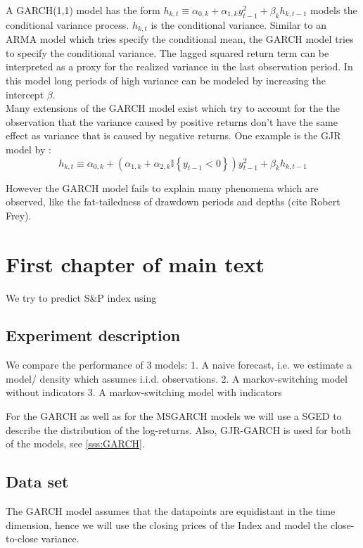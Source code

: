 \documentclass[11pt,a4paper]{article}
\begin{document}
A GARCH(1,1) model has the form $h_{k, t} \equiv \alpha_{0, k}+\alpha_{1, k} y_{t-1}^{2}+\beta_{k} h_{k, t-1}$ models the conditional variance process. $h_{k,t}$ is the conditional variance. Similar to an \ac{ARMA} model which tries specify the conditional mean, the \ac{GARCH} model tries to specify the conditional variance. The lagged squared return term can be interpreted as a proxy for the realized variance in the last observation period. 
In this model long periods of high variance can be modeled by increasing the intercept $\beta$.\\

Many extensions of the GARCH model exist which try to account for the the observation that the variance caused by positive returns don't have the same effect as variance that is caused by negative returns. One example is the GJR model by \cite{glosten_relation_1993}: $$ h_{k, t} \equiv \alpha_{0, k}+\left(\alpha_{1, k}+\alpha_{2, k} \mathbb{I}\left\{y_{t-1}<0\right\}\right) y_{t-1}^2+\beta_k h_{k, t-1}$$

However the GARCH model fails to explain many phenomena which are observed, like the fat-tailedness of drawdown periods and depths (cite Robert Frey).

\section{First chapter of main text}
We try to predict S\&P index using 

\subsection{Experiment description}
We compare the performance of 3 models: 
1. A naive forecast, i.e. we estimate a model/ density which assumes i.i.d. observations. 
2. A markov-switching model without indicators
3. A markov-switching model with indicators

For the GARCH as well as for the MSGARCH models we will use a \ac{SGED} to describe the distribution of the log-returns.
Also, GJR-GARCH is used for both of the models, see \cref{sss:GARCH}.


\subsection{Data set}
The GARCH model assumes that the datapoints are equidistant in the time dimension, hence we will use the closing prices of the Index and model the close-to-close variance.
\end{document}
